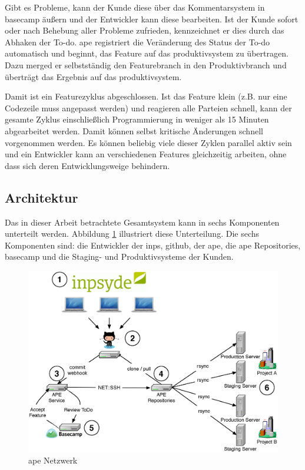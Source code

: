Gibt es Probleme, kann der Kunde diese über das Kommentarsystem in \gls{basecamp} äußern und der Entwickler kann diese bearbeiten. Ist der Kunde sofort oder nach Behebung aller Probleme zufrieden, kennzeichnet er dies durch das Abhaken der To-do. \gls{ape} registriert die Veränderung des Status der To-do automatisch und beginnt, das Feature auf das \gls{produktivsystem} zu übertragen. Dazu merged er selbstständig den Featurebranch in den Produktivbranch und überträgt das Ergebnis auf das \gls{produktivsystem}.

Damit ist ein Featurezyklus abgeschlossen. Ist das Feature klein (z.B. nur eine Codezeile muss angepasst werden) und reagieren alle Parteien schnell, kann der gesamte Zyklus einschließlich Programmierung in weniger als 15 Minuten abgearbeitet werden. Damit können selbst kritische Änderungen schnell vorgenommen werden. Es können beliebig viele dieser Zyklen parallel aktiv sein und ein Entwickler kann an verschiedenen Features gleichzeitig arbeiten, ohne dass sich deren Entwicklungsweige behindern.


\subsection{Architektur} %
\label{sub:architektur}

Das in dieser Arbeit betrachtete Gesamtsystem kann in sechs Komponenten unterteilt werden. Abbildung \ref{fig:ape_network} illustriert diese Unterteilung. Die sechs Komponenten sind:  die Entwickler der \gls{inps},  \gls{github},  der \gls{ape},  die \gls{ape} Repositories,  \gls{basecamp} und  die Staging- und Produktivsysteme der Kunden.

\begin{figure}
	\includegraphics[width=1.0\textwidth]{assets/ape_network.eps}
	\caption{\gls{ape} Netzwerk}
	\label{fig:ape_network}
\end{figure}

